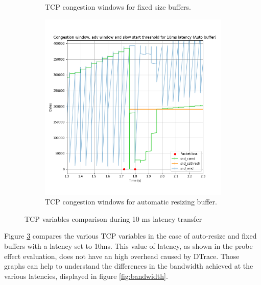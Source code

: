 \documentclass[a4paper,10pt]{article}
\begin{document}
\begin{figure}[]
\begin{subfigure}{0.5\textwidth}
   \caption{TCP congestion windows for fixed size buffers.}
    \label{fig:10ms_fixed}
\end{subfigure}
\qquad
\begin{subfigure}{0.5\textwidth}
   \centering
   \includegraphics[width=\textwidth]{images/10_detail_windows_auto.png}
    \caption{TCP congestion windows for automatic resizing buffer.}
    \label{fig:10ms_auto}
\end{subfigure}

\caption[short]{TCP variables comparison during 10 ms latency transfer}
\label{fig:tcp_variables}
\end{figure}

Figure \ref{fig:tcp_variables} compares the various TCP variables in the case of auto-resize and fixed buffers with a latency set to 10ms. This value of latency, as shown in the probe effect evaluation, does not have an high overhead caused by DTrace. Those graphs can help to understand the differences in the bandwidth achieved at the various latencies, displayed in figure \ref{fig:bandwidth}. 
\end{document}
